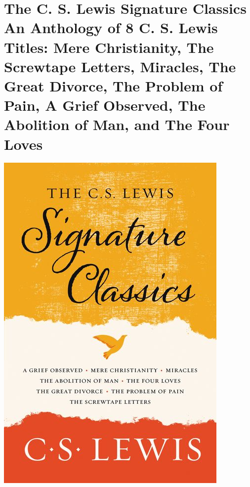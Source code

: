 \documentclass{tufte-handout}
\makeatletter
\newcommand{\varcaption}[2][0pt]{%
  \gsetlength{\@tufte@caption@vertical@offset}{-#1}%
  \gdef\@tufte@stored@varcaption{#2}%
}
\gdef\@tufte@stored@varcaption{} %
\makeatother
\begin{document}
\section*{The C. S. Lewis Signature Classics An Anthology of 8 C. S. Lewis Titles: Mere Christianity, The Screwtape Letters, Miracles, \newline The Great Divorce, The Problem of Pain, A Grief Observed, \newline The Abolition of Man, and The Four Loves}
\begin{marginfigure}[8\baselineskip]
   \includegraphics[width=\linewidth]{images/cs_lewis.jpg}
   \varcaption{\href{https://www.harpercollins.com/9780062572547/the-c-s-lewis-signature-classics/}{Publisher Link}, \href{https://www.amazon.com/gp/product/0062572547}{Amazon Link}}
\end{marginfigure}
\end{document}
